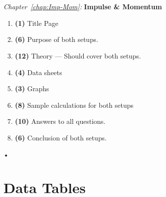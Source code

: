 \documentclass[main.tex]{subfiles}
\begin{document}
\begin{samepage}
\hrulefill \\ \\
\emph{Chapter~\ref{chap:Imp-Mom}:} \textbf{Impulse \& Momentum}
\begin{enumerate}
\item
\textbf{(1)} Title Page
\item
\textbf{(6)} Purpose of both setups.
\item
\textbf{(12)} Theory --- Should cover both setups.
\item
\textbf{(4)} Data sheets
\item
\textbf{(3)} Graphs
\item
\textbf{(8)} Sample calculations for both setups
\item
\textbf{(10)} Answers to all questions.
\item
\textbf{(6)} Conclusion of both setups.
\end{enumerate}•
\end{samepage}

\newpage
\section{Data Tables}
\end{document}
